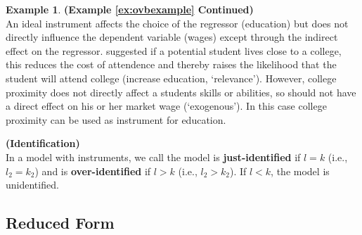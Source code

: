 \documentclass[11pt]{article} %
\theoremstyle{definition}
\numberwithin{defn}{subsection}
\numberwithin{thm}{subsection}
\newtheorem{ex}{Example}
\numberwithin{ex}{subsection}
\begin{document}
\begin{ex}
	\textbf{(Example \ref{ex:ovbexample} Continued)}\\
	An ideal instrument affects the choice of the regressor	(education) but does not directly influence the dependent variable (wages) except through the
	indirect effect on the regressor. \cite{card1993NBER} suggested if a potential student lives close to a college, this reduces the cost of attendence and thereby raises the likelihood that the student will attend college (increase education, `relevance'). However, college proximity does not directly affect a students skills or abilities, so should not have a direct effect on his or her market wage (`exogenous'). In this case college proximity can be used as instrument for education.
\end{ex}

\begin{defn}
	\textbf{(Identification)}\\
	In a model with instruments, we call the model is \textbf{just-identified} if $l=k$ (i.e., $l_2=k_2$) and is \textbf{over-identified} if $l>k$ (i.e., $l_2>k_2$). If $l<k$, the model is unidentified.
\end{defn}

\subsection{Reduced Form}



\newpage


\end{document}
